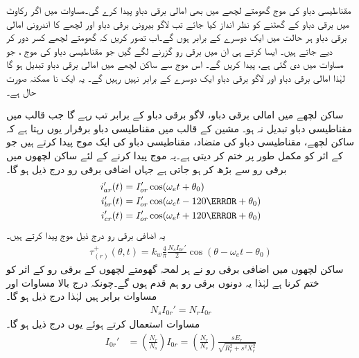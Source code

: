 مقناطیسی دباو کی موج  گھومتے لچھے میں بھی امالی برقی دباو پیدا کرے گی۔مساوات   میں  اگر رکاوٹ میں برقی دباو کے گھٹنے کو نظر انداز کیا جائے تب لاگو بیرونی برقی دباو اور لچھے کا اندرونی امالی برقی دباو ہر حالت میں ایک دوسرے کے برابر ہوں گے۔اب تصور کریں کہ گھومتے لچھے کسر دور کر دیے جاتے ہیں۔ ایسا کرتے ہی ان میں برقی رو گزرنے لگے گیں جو مقناطیسی دباو کی موج  ، جو مساوات   میں دی گئی ہے،  پیدا کریں گے۔ اس موج سے ساکن لچھے میں امالی برقی دباو  تبدیل ہو  گا لہٰذا امالی برقی دباو اور  لاگو برقی دباو ایک دوسرے کے برابر نہیں رہیں گے۔ یہ ایک نا ممکنہ صورت حال ہے۔

ساکن لچھے میں امالی برقی دباو،  لاگو برقی دباو کے برابر تب رہے گا جب قالب میں مقناطیسی دباو تبدیل نہ ہو۔ مشین کے قالب میں مقناطیسی دباو برقرار یوں رہتا ہے کہ ساکن لچھے،  مقناطیسی دباو   کی متضاد، مقناطیسی دباو کی ایک موج پیدا کرتے ہیں جو  کے اثر کو مکمل طور پر ختم کر دیتی ہے۔یہ موج پیدا کرنے کے لئے ساکن لچھوں میں برقی رو  سے بڑھ کر  ہو جاتی ہے جہاں اضافی برقی رو درج ذیل ہو گا۔
\begin{gather}
\begin{aligned}\label{مساوات_امالی_تین_رو_الف}
i_{ar}'(t)&=I_{or}' \cos (\omega_e t+\theta_0)\\
i_{br}'(t)&=I_{or}' \cos (\omega_e t-120\degree+\theta_0)\\
i_{cr}'(t)&=I_{or}' \cos (\omega_e t+120\degree+\theta_0)
\end{aligned}
\end{gather}
یہ اضافی برقی رو درج ذیل موج پیدا کرتے ہیں۔
\begin{align}
\tau_{(r)}^+(\theta,t)=k_w \frac{4}{\pi}\frac{N_s I_{0r}'}{2} \cos (\theta-\omega_e t -\theta_0)
\end{align}
ساکن لچھوں میں اضافی برقی رو نے ہر لمحہ گھومتے لچھوں کے برقی رو کے اثر کو ختم کرنا ہے لہٰذا یہ دونوں برقی رو ہم قدم  ہوں گے۔چونکہ درج بالا مساوات اور مساوات   برابر ہیں لہٰذا درج ذیل ہو گا۔
\begin{align}
N_s I_{0r}'=N_r I_{0r}
\end{align}
مساوات  استعمال کرتے ہوئے یوں درج ذیل ہو گا۔
\begin{align}
I_{0r}'&=\left(\frac{N_r}{N_s}\right) I_{0r}=\left(\frac{N_r}{N_s}\right) \frac{s E_r}{\sqrt{R_r^2+s^2 X_r^2}}
\end{align}
